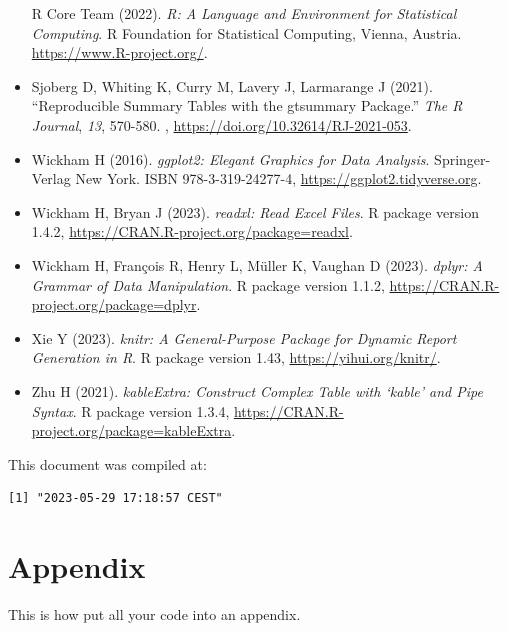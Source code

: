 \documentclass[
]{article}
\begin{document}
\begin{itemize}
  R Core Team (2022). \emph{R: A Language and Environment for
  Statistical Computing}. R Foundation for Statistical Computing,
  Vienna, Austria. \url{https://www.R-project.org/}.
\item
  Sjoberg D, Whiting K, Curry M, Lavery J, Larmarange J (2021).
  ``Reproducible Summary Tables with the gtsummary Package.'' \emph{The
  R Journal}, \emph{13}, 570-580. ,
  \url{https://doi.org/10.32614/RJ-2021-053}.
\item
  Wickham H (2016). \emph{ggplot2: Elegant Graphics for Data Analysis}.
  Springer-Verlag New York. ISBN 978-3-319-24277-4,
  \url{https://ggplot2.tidyverse.org}.
\item
  Wickham H, Bryan J (2023). \emph{readxl: Read Excel Files}. R package
  version 1.4.2, \url{https://CRAN.R-project.org/package=readxl}.
\item
  Wickham H, François R, Henry L, Müller K, Vaughan D (2023).
  \emph{dplyr: A Grammar of Data Manipulation}. R package version 1.1.2,
  \url{https://CRAN.R-project.org/package=dplyr}.
\item
  Xie Y (2023). \emph{knitr: A General-Purpose Package for Dynamic
  Report Generation in R}. R package version 1.43,
  \url{https://yihui.org/knitr/}.
\item
  Zhu H (2021). \emph{kableExtra: Construct Complex Table with `kable'
  and Pipe Syntax}. R package version 1.3.4,
  \url{https://CRAN.R-project.org/package=kableExtra}.
\end{itemize}

This document was compiled at:

\begin{verbatim}
[1] "2023-05-29 17:18:57 CEST"
\end{verbatim}

\hypertarget{appendix}{%
\section{Appendix}\label{appendix}}

This is how put all your code into an appendix.
\end{document}
